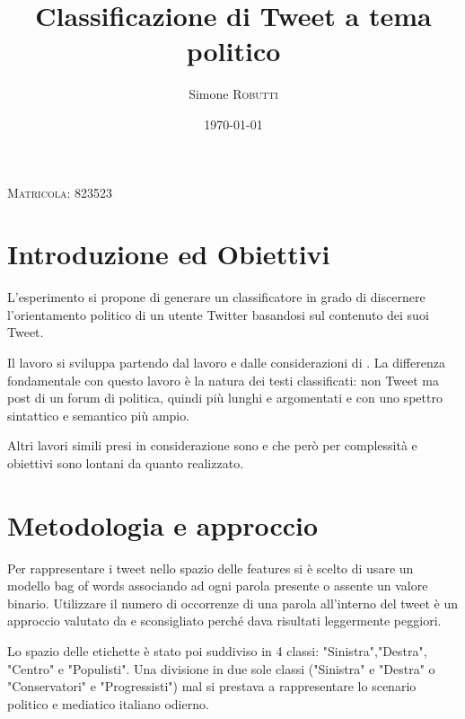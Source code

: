 \documentclass{article}
\title{Classificazione di Tweet a tema politico} %
\date{\today} %
\author{Simone \textsc{Robutti}} %
\begin{document}
\maketitle %
\begin{center}
\textsc{Matricola: 823523}

\end{center} 


\tableofcontents


\section{Introduzione ed Obiettivi}
L'esperimento si propone di generare un classificatore in grado di discernere l'orientamento politico di un utente Twitter basandosi sul contenuto dei suoi Tweet.

Il lavoro si sviluppa partendo dal lavoro e dalle considerazioni di \cite{sides}. La differenza fondamentale con questo lavoro è la natura dei testi classificati: non Tweet ma post di un forum di politica, quindi più lunghi e argomentati e con uno spettro sintattico e semantico più ampio.

Altri lavori simili presi in considerazione sono \cite{pennacchiotti} e \cite{durant} che però per complessità e obiettivi sono lontani da quanto realizzato.


\section{Metodologia e approccio}

Per rappresentare i tweet nello spazio delle features si è scelto di usare un modello bag of words associando ad ogni parola presente o assente un valore binario. Utilizzare il numero di occorrenze di una parola all'interno del tweet è un approccio valutato da \cite{sides} e sconsigliato perché dava risultati leggermente peggiori.

Lo spazio delle etichette è stato poi suddiviso in 4 classi: "Sinistra","Destra", "Centro" e "Populisti". Una divisione in due sole classi ("Sinistra" e "Destra" o "Conservatori" e "Progressisti") mal si prestava a rappresentare lo scenario politico e mediatico italiano odierno. 
\end{document}

